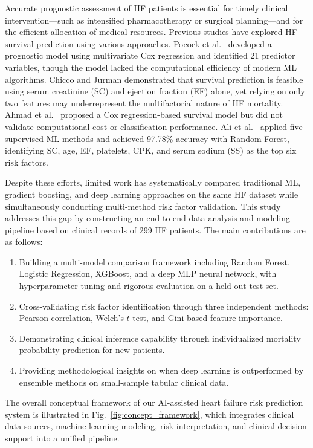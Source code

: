 \documentclass[12pt,a4paper]{article}
\begin{document}
Accurate prognostic assessment of HF patients is essential for timely clinical intervention---such as intensified pharmacotherapy or surgical planning---and for the efficient allocation of medical resources. Previous studies have explored HF survival prediction using various approaches. Pocock et al.\ \citep{pocock2006} developed a prognostic model using multivariate Cox regression and identified 21 predictor variables, though the model lacked the computational efficiency of modern ML algorithms. Chicco and Jurman \citep{chicco2020ml} demonstrated that survival prediction is feasible using serum creatinine (SC) and ejection fraction (EF) alone, yet relying on only two features may underrepresent the multifactorial nature of HF mortality. Ahmad et al.\ \citep{ahmad2017} proposed a Cox regression-based survival model but did not validate computational cost or classification performance. Ali et al.\ \citep{ali2023ml} applied five supervised ML methods and achieved 97.78\% accuracy with Random Forest, identifying SC, age, EF, platelets, CPK, and serum sodium (SS) as the top six risk factors.

Despite these efforts, limited work has systematically compared traditional ML, gradient boosting, and deep learning approaches on the same HF dataset while simultaneously conducting multi-method risk factor validation. This study addresses this gap by constructing an end-to-end data analysis and modeling pipeline based on clinical records of 299 HF patients. The main contributions are as follows:

\begin{enumerate}[label=(\alph*)]
    \item Building a multi-model comparison framework including Random Forest, Logistic Regression, XGBoost, and a deep MLP neural network, with hyperparameter tuning and rigorous evaluation on a held-out test set.
    \item Cross-validating risk factor identification through three independent methods: Pearson correlation, Welch's $t$-test, and Gini-based feature importance.
    \item Demonstrating clinical inference capability through individualized mortality probability prediction for new patients.
    \item Providing methodological insights on when deep learning is outperformed by ensemble methods on small-sample tabular clinical data.
\end{enumerate}

The overall conceptual framework of our AI-assisted heart failure risk prediction system is illustrated in Fig.~\ref{fig:concept_framework}, which integrates clinical data sources, machine learning modeling, risk interpretation, and clinical decision support into a unified pipeline.
\end{document}
